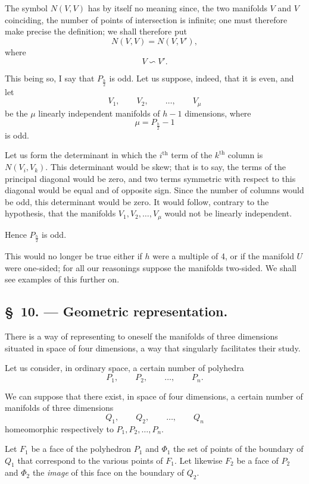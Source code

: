 \documentclass{article}
\begin{document}
The symbol $N(V, V)$ has by itself no meaning since, the two manifolds $V$ and $V$ coinciding, the number of points of intersection is infinite;
one must therefore make precise the definition; we shall therefore put
\[
N(V, V) = N(V, V'),
\]
where
\[
V \backsim V'.
\]

This being so, I say that $P_{\frac{h}{2}}$ is odd. Let us suppose, indeed, that it is even, and let
\[
V_{1}, \qquad V_{2}, \qquad \ldots, \qquad V_{\mu}
\]
be the $\mu$ linearly independent manifolds of $h-1$ dimensions, where
\[
\mu = P_{\frac{h}{2}} - 1
\]
is odd.

Let us form the determinant in which the $i^{\text{th}}$ term of the $k^{\text{th}}$ column is $N(V_{i}, V_{k})$. This determinant would be skew; that is to say, the terms of the principal diagonal would be zero, and two terms symmetric with respect to this diagonal would be equal and of opposite sign. Since the number of columns would be odd, this determinant would be zero. It would follow, contrary to the hypothesis, that the manifolds $V_{1}, V_{2}, \ldots, V_{\mu}$ would not be linearly independent.

Hence $P_{\frac{h}{2}}$ is odd.

This would no longer be true either if $h$ were a multiple of 4, or if the manifold $U$ were one-sided; for all our reasonings suppose the manifolds two-sided. We shall see examples of this further on.

\subsection*{\S~10. --- Geometric representation.}

There is a way of representing to oneself the manifolds of three dimensions situated in space of four dimensions, a way that singularly facilitates their study.

Let us consider, in ordinary space, a certain number of polyhedra
\[
P_{1}, \qquad P_{2}, \qquad \ldots, \qquad P_{n}.
\]

We can suppose that there exist, in space of four dimensions, a certain number of manifolds of three dimensions
\[
Q_{1}, \qquad Q_{2}, \qquad \ldots, \qquad Q_{n}
\]
homeomorphic respectively to $P_{1}, P_{2}, \ldots, P_{n}$.

Let $F_{1}$ be a face of the polyhedron $P_{1}$ and $\Phi_{1}$ the set of points of the boundary of $Q_{1}$ that correspond to the various points of $F_{1}$. Let likewise $F_{2}$ be a face of $P_{2}$ and $\Phi_{2}$ the \emph{image} of this face on the boundary of $Q_{2}$.
\end{document}
